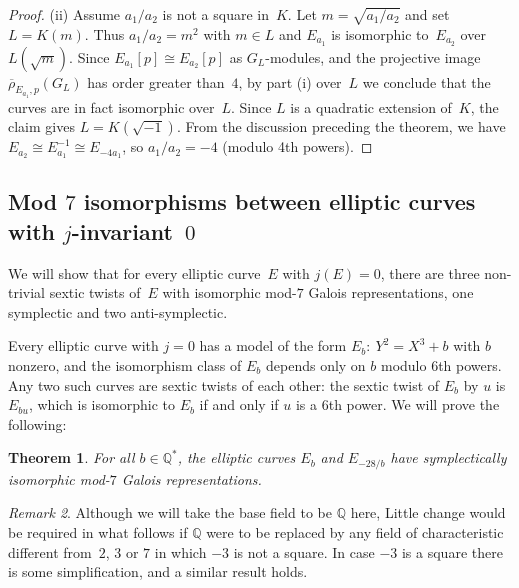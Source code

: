 \documentclass[12pt]{amsart}
\newcommand{\Q}{\mathbb{Q}}
\newcommand{\rhobar}{{\overline{\rho}}}
\numberwithin{equation}{section}
\newtheorem{theorem}{Theorem}[section]
\theoremstyle{definition}
\theoremstyle{remark}
\newtheorem{remark}[theorem]{Remark}
\begin{document}
\begin{proof}
(ii) Assume $a_1/a_2$ is not a square in~$K$.  Let $m=\sqrt{a_1/a_2}$
and set $L=K(m)$. Thus $a_1/a_2 = m^2$ with $m \in L$ and $E_{a_1}$ is
isomorphic to~$E_{a_2}$ over~$L(\sqrt{m})$.  Since $E_{a_1}[p]\cong
E_{a_2}[p]$ as $G_L$-modules, and the projective image $\rhobar_{E_{a_1},p}(G_L)$
has order greater than~$4$, by part (i) over~$L$ we conclude that the
curves are in fact isomorphic over~$L$.  Since $L$ is a quadratic
extension of~$K$, the claim gives $L=K(\sqrt{-1})$.  From the discussion preceding the theorem, we have
$E_{a_2}\cong E_{a_1}^{-1} \cong E_{-4a_1}$, so $a_1/a_2 = -4$ (modulo
4th powers).
\end{proof}

\subsection{Mod $7$ isomorphisms between elliptic curves with
$j$-invariant~$0$} We will show that for every elliptic curve~$E$ with
$j(E)=0$, there are three non-trivial sextic twists of~$E$ with
isomorphic mod-$7$ Galois representations, one symplectic and two
anti-symplectic.

Every elliptic curve with $j=0$ has a model of the form
$E_b:\ Y^2=X^3+b$ with $b$ nonzero, and the isomorphism class of $E_b$
depends only on $b$ modulo $6$th powers.  Any two such curves are
sextic twists of each other: the sextic twist of $E_b$ by $u$ is
$E_{bu}$, which is isomorphic to $E_b$ if and only if $u$ is a $6$th
power.  We will prove the following:

\begin{theorem}\label{T:j=0}
For all $b \in \Q^*$, the elliptic curves $E_b$ and $E_{-28/b}$ have
symplectically isomorphic mod-$7$ Galois representations.
\end{theorem}

\begin{remark}Although we will take the base field to be $\Q$ here,  Little 
change would be required in what follows if $\Q$ were to be replaced
by any field of characteristic different from~$2$, $3$ or $7$ in which
$-3$ is not a square.  In case $-3$ is a square there is some
simplification, and a similar result holds.
\end{remark}
\end{document}
